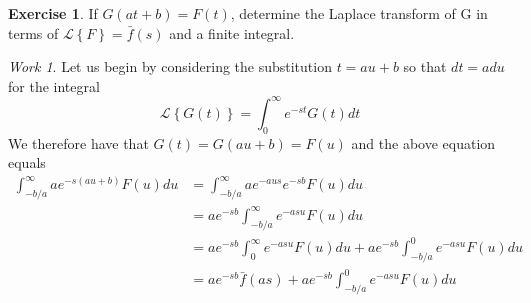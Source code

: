 \documentclass{report}
\theoremstyle{definition}
\newtheorem{exercise}{Exercise}[chapter]
\theoremstyle{remark}
\newtheorem*{work}{Work}
\newcommand{\lapt}[1]{\mathscr{L}\left\{ #1\right\}}
\begin{document}
\begin{exercise}
    If $G(at+b)=F(t)$, determine the Laplace transform of G in terms of $\lapt{F} =\bar{f}(s)$ and a finite integral.
\end{exercise}
\begin{work}
    Let us begin by considering the substitution $t=au+b$ so that $dt=adu$ for the integral 
    \begin{equation*}
        \lapt{G(t)} = \int^\infty_0e^{-st}G(t)dt
    \end{equation*}
    We therefore have that $G(t) = G(au+b) = F(u)$ and the above equation equals 
    \begin{equation*}
    \begin{split}
        \int^\infty_{-b/a} ae^{-s(au+b)}F(u)du &= \int^\infty_{-b/a}ae^{-aus}e^{-sb}F(u)du \\
        &=ae^{-sb}\int^\infty_{-b/a} e^{-asu}F(u)du\\
        &=ae^{-sb}\int^\infty_0e^{-asu}F(u)du + ae^{-sb}\int^0_{-b/a}e^{-asu}F(u)du \\
        &=ae^{-sb}\bar{f}(as)+ae^{-sb}\int^0_{-b/a}e^{-asu}F(u)du
    \end{split}
    \end{equation*}
\end{work}
\end{document}
